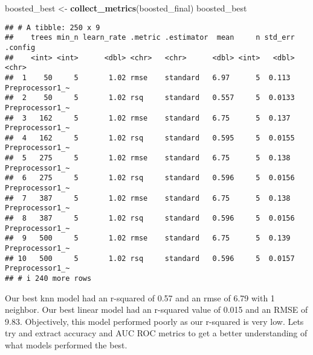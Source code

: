 \documentclass[
]{article}
\newenvironment{Shaded}{\begin{snugshade}}{\end{snugshade}}
\newcommand{\FunctionTok}[1]{\textcolor[rgb]{0.13,0.29,0.53}{\textbf{#1}}}
\newcommand{\NormalTok}[1]{#1}
\newcommand{\OtherTok}[1]{\textcolor[rgb]{0.56,0.35,0.01}{#1}}
\begin{document}
\begin{Shaded}
\begin{Highlighting}[]
\NormalTok{boosted\_best }\OtherTok{\textless{}{-}} \FunctionTok{collect\_metrics}\NormalTok{(boosted\_final)}
\NormalTok{boosted\_best}
\end{Highlighting}
\end{Shaded}

\begin{verbatim}
## # A tibble: 250 x 9
##    trees min_n learn_rate .metric .estimator  mean     n std_err .config        
##    <int> <int>      <dbl> <chr>   <chr>      <dbl> <int>   <dbl> <chr>          
##  1    50     5       1.02 rmse    standard   6.97      5  0.113  Preprocessor1_~
##  2    50     5       1.02 rsq     standard   0.557     5  0.0133 Preprocessor1_~
##  3   162     5       1.02 rmse    standard   6.75      5  0.137  Preprocessor1_~
##  4   162     5       1.02 rsq     standard   0.595     5  0.0155 Preprocessor1_~
##  5   275     5       1.02 rmse    standard   6.75      5  0.138  Preprocessor1_~
##  6   275     5       1.02 rsq     standard   0.596     5  0.0156 Preprocessor1_~
##  7   387     5       1.02 rmse    standard   6.75      5  0.138  Preprocessor1_~
##  8   387     5       1.02 rsq     standard   0.596     5  0.0156 Preprocessor1_~
##  9   500     5       1.02 rmse    standard   6.75      5  0.139  Preprocessor1_~
## 10   500     5       1.02 rsq     standard   0.596     5  0.0157 Preprocessor1_~
## # i 240 more rows
\end{verbatim}

Our best knn model had an r-squared of 0.57 and an rmse of 6.79 with 1
neighbor. Our best linear model had an r-squared value of 0.015 and an
RMSE of 9.83. Objectively, this model performed poorly as our r-squared
is very low. Lets try and extract accuracy and AUC ROC metrics to get a
better understanding of what models performed the best.
\end{document}
